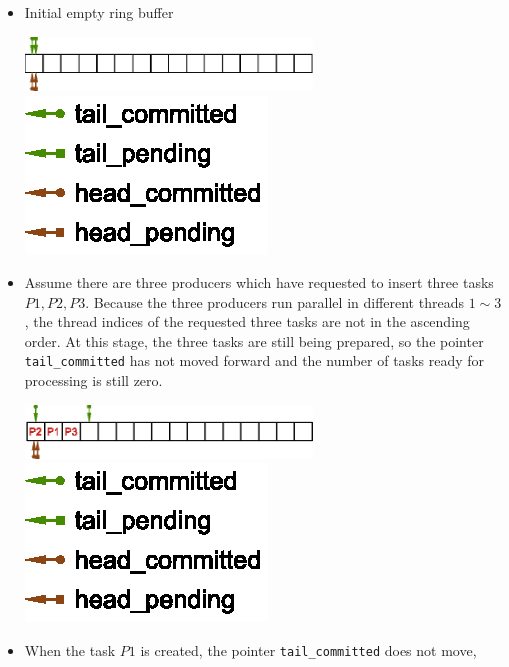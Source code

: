 \documentclass[11pt, a4paper]{book}
\begin{document}
\begin{itemize}
\item Initial empty ring buffer
  \begin{center}
    \includegraphics[width=0.6\textwidth,
    keepaspectratio]{figures/2023-05-10-ring-buffer-initial-empty}
    \includegraphics{figures/2023-05-10-ring-buffer-pointer-symbols}
  \end{center}
\item Assume there are three producers which have requested to insert three tasks
  $P1, P2, P3$. Because the three producers run parallel in different threads $1 \sim 3$,
  the thread indices of the requested three tasks are not in the ascending order. At this
  stage, the three tasks are still being prepared, so the pointer \texttt{tail\_committed}
  has not moved forward and the number of tasks ready for processing is still zero.
  \begin{center}
    \includegraphics[width=0.6\textwidth,
    keepaspectratio]{figures/2023-05-10-ring-buffer-add-three-tasks}
    \includegraphics{figures/2023-05-10-ring-buffer-pointer-symbols}
  \end{center}
\item When the task $P1$ is created, the pointer \texttt{tail\_committed} does not move,

\end{itemize}
\end{document}
